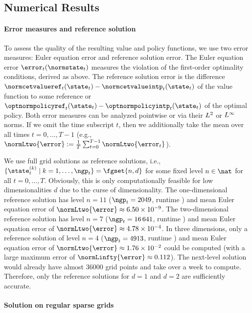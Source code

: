 \subsection{Numerical Results}

\paragraph{Error measures and reference solution}

To assess the quality of the resulting value and policy functions,
we use two error measures:
Euler equation error and reference solution error.
The Euler equation error $\error_t(\normstate_t)$
measures the violation of the first-order optimality conditions,
derived as above.
The reference solution error is the difference
$\normcetvalueref_t(\state_t) - \normcetvalueintp_t(\state_t)$
of the value function to some reference or
$\optnormpolicyref_t(\state_t) - \optnormpolicyintp_t(\state_t)$
of the optimal policy.
Both error measures can be analyzed pointwise or
via their $L^2$ or $L^\infty$ norms.
If we omit the time subscript $t$,
then we additionally take the mean over all times $t = 0, \dotsc, T - 1$
(e.g., $
  \normLtwo{\error} := \frac{1}{T} \sum_{t=0}^{T-1} \normLtwo{\error_t}
$).

We use full grid solutions as reference solutions,
i.e., $\{\state_t^{(k)} \mid k = 1, \dotsc, \ngp_t\} = \fgset{n,d}$
for some fixed level $n \in \nat$ for all $t = 0, \dotsc, T$.
Obviously, this is only computationally feasible
for low dimensionalities $d$ due to the curse of dimensionality.
The one-dimensional reference solution has level $n = 11$
($\ngp_t = \num{2049}$, runtime ) and
mean Euler equation error of
$\normLtwo{\error} \approx \num{6.50e-9}$.
The two-dimensional reference solution has level $n = 7$
($\ngp_t = \num{16641}$, runtime ) and
mean Euler equation error of
$\normLtwo{\error} \approx \num{4.78e-4}$.
In three dimensions, only a reference solution of level $n = 4$
($\ngp_t = \num{4913}$, runtime ) and
mean Euler equation error of
$\normLtwo{\error} \approx \num{1.76e-2}$ could be computed
(with a large maximum error of $\normLinfty{\error} \approx \num{0.112}$).
The next-level solution would already have almost \num{36000} grid points
and take over a week to compute.
Therefore, only the reference solutions for $d = 1$ and $d = 2$
are sufficiently accurate.

\paragraph{Solution on regular sparse grids}

